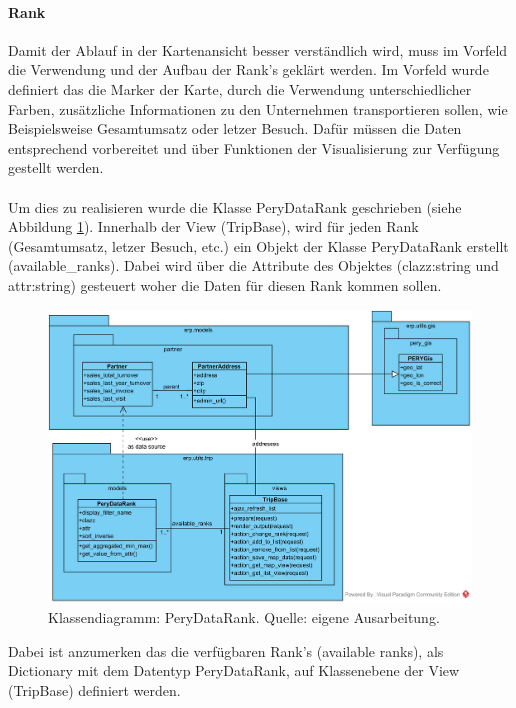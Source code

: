 \documentclass[Bachelorarbeit.tex]{subfiles}
\begin{document}
\paragraph{Rank}
\label{Rank}
Damit der Ablauf in der Kartenansicht besser verständlich wird, muss im Vorfeld die Verwendung und der Aufbau der Rank's geklärt werden.
Im Vorfeld wurde definiert das die Marker der Karte, durch die Verwendung unterschiedlicher Farben, zusätzliche Informationen zu den Unternehmen transportieren sollen, wie Beispielsweise Gesamtumsatz oder letzer Besuch.
Dafür müssen die Daten entsprechend vorbereitet und über Funktionen der Visualisierung zur Verfügung gestellt werden. \\
\\
Um dies zu realisieren wurde die Klasse PeryDataRank geschrieben (siehe Abbildung \ref{fig:ClassDiagrammRank}). 
Innerhalb der View (TripBase), wird für jeden Rank (Gesamtumsatz, letzer Besuch, etc.) ein Objekt der Klasse PeryDataRank erstellt (available\_ranks).
Dabei wird über die Attribute des Objektes (clazz:string und attr:string) gesteuert woher die Daten für diesen Rank kommen sollen. \\

\begin{figure}[H]
\centering
\includegraphics[width=0.9\linewidth]{img/Implementierung/ClassDiagrammRank}
\caption[k]{Klassendiagramm: PeryDataRank. Quelle: eigene Ausarbeitung.}
\label{fig:ClassDiagrammRank}
\end{figure}

Dabei ist anzumerken das die verfügbaren Rank's (available ranks), als Dictionary mit dem Datentyp PeryDataRank, auf Klassenebene der View (TripBase) definiert werden.
\end{document}
